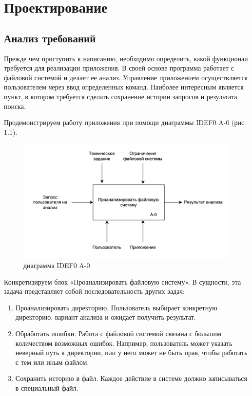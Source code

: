 \chapter{Проектирование} \label{ch13}


\section{Анализ требований} \label{ch1:sec13}

Прежде чем приступить к написанию, необходимо определить, какой функционал требуется для реализации приложения. В своей основе программа работает с файловой системой и делает ее анализ. Управление приложением осуществляется пользователем через ввод определенных команд. Наиболее интересным является пункт, в котором требуется сделать сохранение истории запросов и результата поиска.

Продемонстрируем работу приложения при помощи диаграммы IDEF0 A-0 (рис 1.1).

\begin{figure}[ht] 
	\center
	\includegraphics [scale=0.17] {my_folder/images/IDEF.png}
	\caption{диаграмма IDEF0 A-0} 
	\label{fig:idef0-A-0}  
\end{figure}

Конкретизируем блок «Проанализировать файловую систему». В сущности, эта задача представляет собой последовательность других задач:
\begin{enumerate}
	\item Проанализировать директорию. Пользователь выбирает конкретную директорию, вариант анализа и ожидает получить результат.
	\item Обработать ошибки. Работа с файловой системой связана с большим количеством возможных ошибок. Например, пользователь может указать неверный путь к директории, или у него может не быть прав, чтобы работать с тем или иным файлом.
	\item Сохранить историю в файл. Каждое действие в системе должно записываться в специальный файл. 
\end{enumerate}

